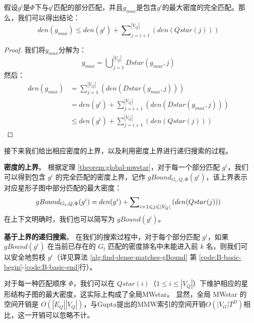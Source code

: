 \begin{theorem} \label{theorem:global-mwstar}
假设$g^i$是$\Phi$下与$q^i$匹配的部分匹配，并且$g_{max}$是包含$g^i$的最大密度的完全匹配。那么，我们可以得出结论：
\begin{equation}\label{equation:global-mwstar}
	den(g_{max}) \leq den(g^i) + \sum\nolimits_{j=i+1}^{|V_Q|} \left(den(Qstar(j))\right)
\end{equation}

\end{theorem}

\begin{proof}
我们将$g_{max}$分解为：
\[
	g_{max} =   \bigcup\nolimits_{j=1}^{|V_Q|} Dstar(g_{max}, j)
\]
然后：
\begin{equation*}
    \begin{aligned}
      den(g_{max}) & =  \sum\nolimits_{j=1}^{|V_Q|} \left( den(Dstar(g_{max}, j)) \right)  \\
        & =  den(g^i) + \sum\nolimits_{j=i+1}^{|V_Q|} \left( den(Dstar(g_{max}, j)) \right) \\
        & \leq den(g^i) + \sum\nolimits_{j=i+1}^{|V_Q|} \left( den(Qstar(j)) \right) 
    \end{aligned}
  \end{equation*}
  \end{proof}
接下来我们给出相应密度的上界，以及利用密度上界进行递归搜索的过程。


\textbf{密度的上界}。 根据定理 \ref{theorem:global-mwstar}，对于每一个部分匹配 $g^i$，我们可以得到包含 $g^i$ 的完全匹配的密度上界，记作 $gBound_{G_t, Q, \Phi}(g^i)$，该上界表示对应星形子图中部分匹配的最大密度：
  \begin{equation}
	 gBound_{G_t, Q, \Phi}(g^i) =  \\ den(g^i) + \sum\nolimits_{i+1\leq j\leq |V_Q|} \left(den(Qstar(j))\right)
  \end{equation}
  在上下文明确时，我们也可以简写为 $gBound(g^i)$。
  
  \textbf{基于上界的递归搜索}。 在我们的搜索过程中，对于每个部分匹配 $g^i$，如果 $gBound(g^i)$ 在当前已存在的 $G_t$ 匹配的密度排名中未能进入前 $k$ 名，则我们可以安全地剪枝 $g^i$（详见算法 \ref{alg:find-dense-matches-gBound}  第 \ref{code:B-basic-begin}-\ref{code:B-basic-end}行）。
  
  对于每一种匹配顺序 $\Phi$，我们可以在 $Qstar(i)$（$1 \leq i \leq |V_Q|$）下维护相应的星形结构子图的最大密度，这实际上构成了全局MWstar。
  显然，全局 MWstar 的空间开销是 $O(|E_Q||V_Q|)$，与Gupta\cite{static-topk-Gupta-DBLP:conf/icde/GuptaGYCH14}提出的MMW索引的空间开销$O(|V_G|T^D)$相比，这一开销可以忽略不计。

